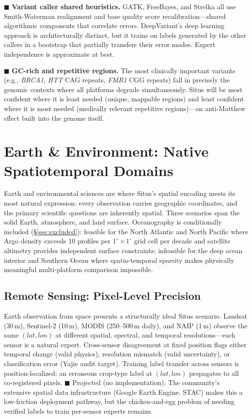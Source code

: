 \documentclass[12pt,a4paper]{article}
\begin{document}
\textcolor{warning}{$\blacksquare$ \textbf{Variant caller shared heuristics.}} GATK, FreeBayes, and Strelka all use Smith-Waterman realignment and base quality score recalibration---shared algorithmic components that correlate errors. DeepVariant's deep learning approach is architecturally distinct, but it trains on labels generated by the other callers in a bootstrap that partially transfers their error modes. Expert independence is approximate at best.

\textcolor{warning}{$\blacksquare$ \textbf{GC-rich and repetitive regions.}} The most clinically important variants (e.g., \textit{BRCA1}, \textit{HTT} CAG repeats, \textit{FMR1} CGG repeats) fall in precisely the genomic contexts where all platforms degrade simultaneously. Situs will be most confident where it is least needed (unique, mappable regions) and least confident where it is most needed (medically relevant repetitive regions)---an anti-Matthew effect built into the genome itself.

\section{Earth \& Environment: Native Spatiotemporal Domains}
\label{sec:earth}

Earth and environmental sciences are where Situs's spatial encoding meets its most natural expression: every observation carries geographic coordinates, and the primary scientific questions are inherently spatial. Three scenarios span the solid Earth, atmosphere, and land surface. Oceanography is conditionally included (\S\ref{sec:excluded}): feasible for the North Atlantic and North Pacific where Argo density exceeds 10 profiles per $1^\circ \times 1^\circ$ grid cell per decade and satellite altimetry provides independent surface constraints; infeasible for the deep ocean interior and Southern Ocean where spatio-temporal sparsity makes physically meaningful multi-platform comparison impossible.

\subsection{Remote Sensing: Pixel-Level Precision}

Earth observation from space presents a structurally ideal Situs scenario. Landsat (30\,m), Sentinel-2 (10\,m), MODIS (250--500\,m daily), and NAIP (1\,m) observe the same $(lat,lon)$ at different spatial, spectral, and temporal resolutions—each sensor is a natural expert. Cross-sensor disagreement at fixed position flags either temporal change (valid physics), resolution mismatch (valid uncertainty), or classification error (Yajie audit target). Training label transfer across sensors is position-localized: an erroneous crop-type label at $(lat,lon)$ propagates to all co-registered pixels. \textcolor{projected}{$\blacksquare$ Projected (no implementation)}: The community's extensive spatial data infrastructure (Google Earth Engine, STAC) makes this a low-friction deployment pathway, but the chicken-and-egg problem of needing verified labels to train per-sensor experts remains.
\end{document}
